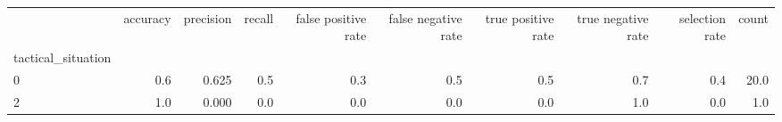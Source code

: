 \begin{tabular}{lrrrrrrrrr}
\toprule
{} &  accuracy &  precision &  recall &  false positive rate &  false negative rate &  true positive rate &  true negative rate &  selection rate &  count \\
tactical\_situation &           &            &         &                      &                      &                     &                     &                 &        \\
\midrule
0                  &       0.6 &      0.625 &     0.5 &                  0.3 &                  0.5 &                 0.5 &                 0.7 &             0.4 &   20.0 \\
2                  &       1.0 &      0.000 &     0.0 &                  0.0 &                  0.0 &                 0.0 &                 1.0 &             0.0 &    1.0 \\
\bottomrule
\end{tabular}
